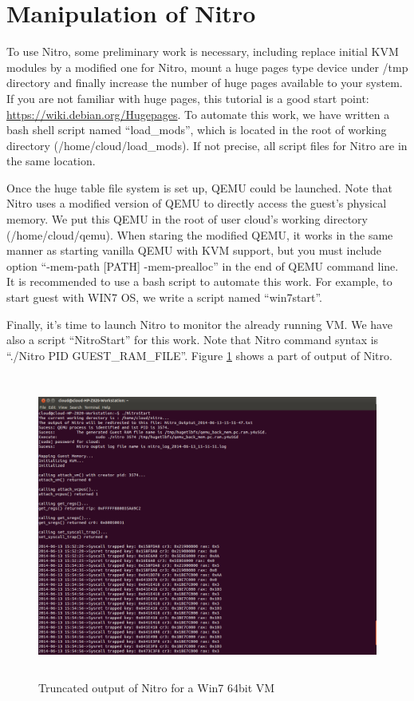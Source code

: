 
\section{Manipulation of Nitro}

To use Nitro, some preliminary work is necessary, including replace initial KVM modules by a modified one for Nitro, 
mount a huge pages type device under /tmp directory and finally increase the number of huge pages available to your system. 
If you are not familiar with huge pages, this tutorial is a good start point: \url{https://wiki.debian.org/Hugepages}. 
To automate this work, we have written a bash shell script named “load\_mods”, which is located in the root of working directory (/home/cloud/load\_mods). 
If not precise, all script files for Nitro are in the same location. 

Once the huge table file system is set up, QEMU could be launched. 
Note that Nitro uses a modified version of QEMU to directly access the guest's physical memory. 
We put this QEMU in the root of user cloud’s working directory (/home/cloud/qemu). 
When staring the modified QEMU, it works in the same manner as starting vanilla QEMU with KVM support, 
but you must include option “-mem-path [PATH] -mem-prealloc” in the end of QEMU command line. 
It is recommended to use a bash script to automate this work. For example, to start guest with WIN7 OS, 
we write a script named “win7start”.

Finally, it’s time to launch Nitro to monitor the already running VM. We have also a script “NitroStart” for this work. 
Note that Nitro command syntax is “./Nitro PID GUEST\_RAM\_FILE”. Figure \ref{fig:Truncated output of Nitro for a Win7 64bit VM} shows a part of output 
of Nitro.

\begin{figure}[htbp]
	\centering
		\includegraphics[width=14cm, height= 10cm ]{Figures/Figure19.png}
	\caption[Truncated output of Nitro for a Win7 64bit VM]{Truncated output of Nitro for a Win7 64bit VM}
	\label{fig:Truncated output of Nitro for a Win7 64bit VM}
\end{figure}

